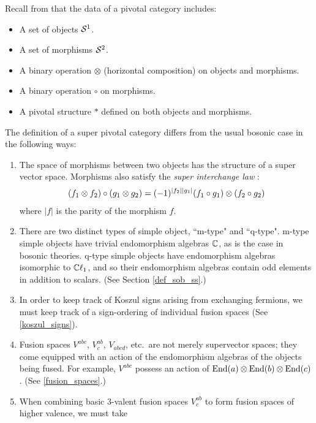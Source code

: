 Recall from 
\cite{Joyal1991}
that the data of a pivotal category includes:
\begin{itemize}
\item A set of objects $\mathcal{S}^1$.
\item A set of morphisms $\mathcal{S}^2$.
\item A binary operation $\otimes$ (horizontal composition) on objects and morphisms.
\item A binary operation $\circ$ on morphisms.
\item A pivotal structure $*$ defined on both objects and morphisms.
\end{itemize}


The definition of a super pivotal category differs from the usual bosonic case in the following ways:

\begin{enumerate}
	\item The space of morphisms between two objects has the structure of 
	a super vector space.
	Morphisms also satisfy the {\em super interchange law} \cite{brundan2016}:
	\begin{align}
	(f_1\otimes f_2) \circ (g_1\otimes g_2) = (-1)^{|f_2| |g_1|} (f_1\circ g_1)\otimes (f_2\circ g_2)
	\end{align}
	where $|f|$ is the parity of the morphism $f$. 
	\item There are two distinct types of simple object, ``m-type" and ``q-type".
	m-type simple objects have trivial endomorphism algebras $\mathbb{C}$, as is the case in bosonic theories.  
	q-type simple objects have endomorphism algebras isomorphic to $\mathbb{C}\ell_1$, 
	and so their endomorphism algebras contain odd elements in addition to scalars. (See Section \ref{def_sob_ss}.)
	\item In order to keep track of Koszul signs arising from exchanging fermions, 
	we must keep track of a sign-ordering of individual fusion spaces (See \ref{koszul_signs}).
	\item Fusion spaces $V^{abc}$, $V^{ab}_c$, $V_{abcd}$, etc.\ are not merely supervector spaces; they come equipped with an action of the
	endomorphism algebras of the objects being fused. 
	For example, $V^{abc}$ possess an action of $\text{End}(a)\otimes \text{End}(b)\otimes \text{End}(c)$.
	(See \ref{fusion_spaces}.)
	\item When combining basic 3-valent fusion spaces $V^{ab}_c$ to form fusion spaces of higher valence, we must take

\end{enumerate}
